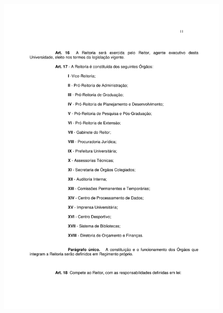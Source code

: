 \begin{figure}[p]
	\centering 
	\includegraphics[scale=0.7]{capitulos/resolucoes/cuni414/cuni414-11.pdf}
\end{figure} \pagebreak

